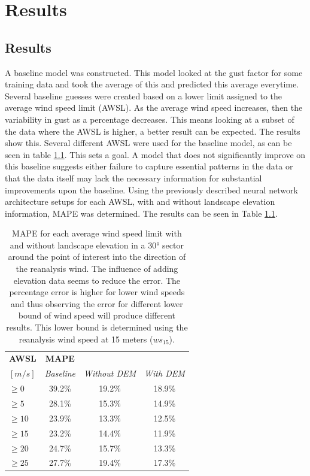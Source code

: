 \chapter{Results}
\label{Chapter4}
\section{Results}
A baseline model was constructed. This model looked at the gust factor for some training data and took the average of this and predicted this average everytime. Several baseline guesses were created based on a lower limit assigned to the average wind speed limit (AWSL). As the average wind speed increases, then the variability in gust as a percentage decreases\cite{mean_gust_HA_HO}. This means looking at a subset of the data where the AWSL is higher, a better result can be expected. The results show this. Several different AWSL were used for the baseline model, as can be seen in table \ref{table:results}. This sets a goal. A model that does not significantly improve on this baseline suggests either failure to capture essential patterns in the data or that the data itself may lack the necessary information for substantial improvements upon the baseline. Using the previously described neural network architecture setups for each AWSL, with and without landscape elevation information, MAPE was determined. The results can be seen in Table \ref{table:results}.

\begin{table}[h]
    \caption[Model results for different AWSL]{MAPE for each average wind speed limit with and without landscape elevation in a 30° sector around the point of interest into the direction of the reanalysis wind. The influence of adding elevation data seems to reduce the error. The percentage error is higher for lower wind speeds and thus observing the error for different lower bound of wind speed will produce different results. This lower bound is determined using the reanalysis wind speed at 15 meters ($ws_{15}$).}
    \label{table:results}
    \centering
    \begin{tabular}{lccc}
        \toprule
        \textbf{AWSL} & \textbf{MAPE} & &\\ 
        $[m/s]$ & \textit{Baseline} &  \textit{Without DEM} & \textit{With DEM} \\
        \midrule
        $\geq 0$ & 39.2\% & 19.2\% & 18.9\% \\
        $\geq 5$ & 28.1\% & 15.3\% & 14.9\%\\
        $\geq 10$ & 23.9\% & 13.3\% & 12.5\%\\
        $\geq 15$ & 23.2\% & 14.4\% & 11.9\%\\
        $\geq 20$ & 24.7\% & 15.7\% & 13.3\%\\
        $\geq 25$ & 27.7\% & 19.4\% & 17.3\%\\
        \bottomrule
    \end{tabular}
\end{table}


